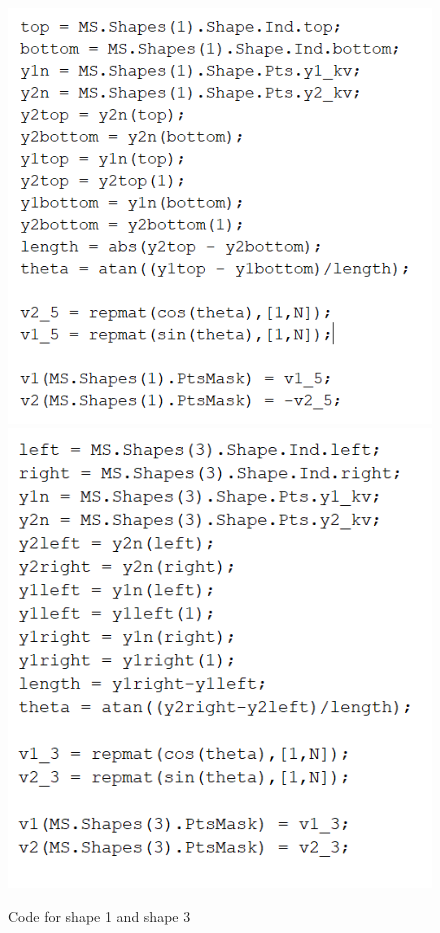 \documentclass[11pt, a4paper]{article}
\theoremstyle{definition}
\begin{document}
		\begin{figure}[h]
			\centering
			\includegraphics[scale=0.6]{C1.png}
			\includegraphics[scale=0.6]{C2.png}
			\caption{Code for shape 1 and shape 3} 
			\label{F1b}
		\end{figure}
	
	
\end{document}
